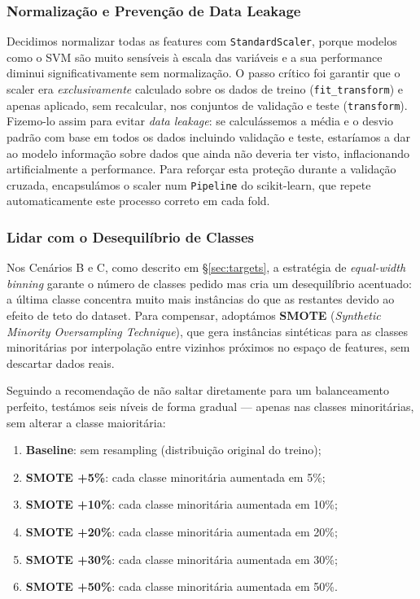 \documentclass[12pt,a4paper]{article}
\begin{document}
\subsubsection{Normalização e Prevenção de Data Leakage}

Decidimos normalizar todas as features com \texttt{StandardScaler}, porque modelos como
o SVM são muito sensíveis à escala das variáveis e a sua performance diminui
significativamente sem normalização. O passo crítico foi garantir que o scaler era \textit{exclusivamente}
calculado sobre os dados de treino (\texttt{fit\_transform}) e apenas aplicado, sem
recalcular, nos conjuntos de validação e teste (\texttt{transform}). Fizemo-lo assim
para evitar \textit{data leakage}: se calculássemos a média e o desvio padrão com base
em todos os dados incluindo validação e teste, estaríamos a dar ao modelo informação
sobre dados que ainda não deveria ter visto, inflacionando artificialmente a performance. Para reforçar
esta proteção durante a validação cruzada, encapsulámos o scaler num \texttt{Pipeline}
do scikit-learn, que repete automaticamente este processo correto em cada fold.

\subsubsection{Lidar com o Desequilíbrio de Classes}
\label{sec:imbalance}

Nos Cenários B e C, como descrito em §\ref{sec:targets}, a estratégia de
\textit{equal-width binning} garante o número de classes pedido mas cria um
desequilíbrio acentuado: a última classe concentra muito mais instâncias do que as
restantes devido ao efeito de teto do dataset. Para compensar, adoptámos
\textbf{SMOTE} (\textit{Synthetic Minority Oversampling Technique}), que gera
instâncias sintéticas para as classes minoritárias por interpolação entre vizinhos
próximos no espaço de features, sem descartar dados reais.

Seguindo a recomendação de não saltar diretamente para um balanceamento perfeito,
testámos seis níveis de forma gradual — apenas nas classes minoritárias, sem alterar
a classe maioritária:

\begin{enumerate}
  \item \textbf{Baseline}: sem resampling (distribuição original do treino);
  \item \textbf{SMOTE +5\%}: cada classe minoritária aumentada em 5\%;
  \item \textbf{SMOTE +10\%}: cada classe minoritária aumentada em 10\%;
  \item \textbf{SMOTE +20\%}: cada classe minoritária aumentada em 20\%;
  \item \textbf{SMOTE +30\%}: cada classe minoritária aumentada em 30\%;
  \item \textbf{SMOTE +50\%}: cada classe minoritária aumentada em 50\%.
\end{enumerate}
\end{document}

